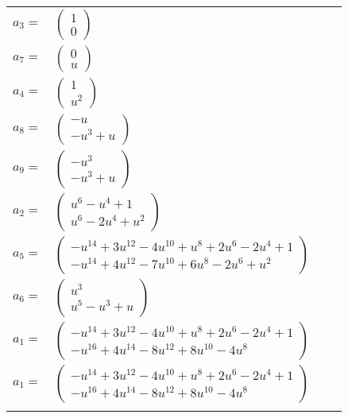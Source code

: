 \documentclass[1p]{elsarticle_modified}
\theoremstyle{definition}
\begin{document}
\begin{tabular}{m{7pt} m{180pt} m{7pt} m{180pt} }
\flushright $a_{3}=$&$\begin{pmatrix}1\\0\end{pmatrix}$ \\
\flushright $a_{7}=$&$\begin{pmatrix}0\\u\end{pmatrix}$ \\
\flushright $a_{4}=$&$\begin{pmatrix}1\\u^2\end{pmatrix}$ \\
\flushright $a_{8}=$&$\begin{pmatrix}- u\\- u^3+u\end{pmatrix}$ \\
\flushright $a_{9}=$&$\begin{pmatrix}- u^3\\- u^3+u\end{pmatrix}$ \\
\flushright $a_{2}=$&$\begin{pmatrix}u^6- u^4+1\\u^6-2 u^4+u^2\end{pmatrix}$ \\
\flushright $a_{5}=$&$\begin{pmatrix}- u^{14}+3 u^{12}-4 u^{10}+u^8+2 u^6-2 u^4+1\\- u^{14}+4 u^{12}-7 u^{10}+6 u^8-2 u^6+u^2\end{pmatrix}$ \\
\flushright $a_{6}=$&$\begin{pmatrix}u^3\\u^5- u^3+u\end{pmatrix}$ \\
\flushright $a_{1}=$&$\begin{pmatrix}- u^{14}+3 u^{12}-4 u^{10}+u^8+2 u^6-2 u^4+1\\- u^{16}+4 u^{14}-8 u^{12}+8 u^{10}-4 u^8\end{pmatrix}$\\ \flushright $a_{1}=$&$\begin{pmatrix}- u^{14}+3 u^{12}-4 u^{10}+u^8+2 u^6-2 u^4+1\\- u^{16}+4 u^{14}-8 u^{12}+8 u^{10}-4 u^8\end{pmatrix}$\\&\end{tabular}
\end{document}
